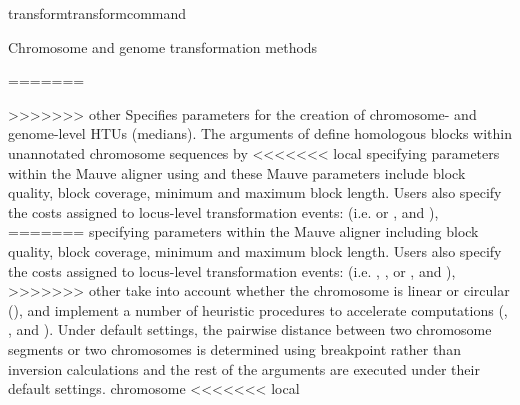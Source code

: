 \begin{command}{transform}{transformcommand}
\begin{arguments}
\begin{argumentgroup}{Chromosome and genome transformation methods}
{=======
                                    
>>>>>>> other
                {Specifies parameters for the creation of  chro\-mosome- and genome-level 
                HTUs (medians). The arguments of  define 
                homologous blocks within unannotated chromosome sequences by
<<<<<<< local
                specifying parameters within the Mauve aligner \cite{darlingetal2004} using
                 and these Mauve parameters include 
                block quality, block coverage, minimum and maximum block
                 length. Users also specify the costs assigned to locus-level transformation 
                 events: (i.e.  %
                 or , and ), 
=======
                specifying parameters within the Mauve aligner \cite{darlingetal2004} 
                including block quality, block coverage, minimum and maximum block
                length. Users also specify the costs assigned to locus-level transformation 
                events: (i.e. , , or 
                , and ), 
>>>>>>> other
                take into account whether the chromosome is linear or circular 
                (), and implement a number of heuristic 
                procedures to accelerate computations (, 
                , and ).  
                Under default settings, the pairwise distance between two chromosome 
                segments or two chromosomes is determined using breakpoint rather 
                than inversion calculations and the rest of the arguments are executed 
                under their default settings.}
                {chromosome}
<<<<<<< local
             
                        
}
\end{argumentgroup}
\end{arguments}
\end{command}
